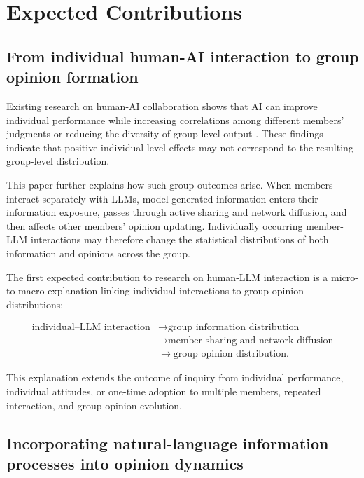 \documentclass[11pt,a4paper]{article}
\begin{document}
\section{Expected Contributions}

\subsection{From individual human-AI interaction to group opinion formation}

Existing research on human-AI collaboration shows that AI can improve individual performance while increasing correlations among different members' judgments or reducing the diversity of group-level output \cite{fugener2021,doshi2024}. These findings indicate that positive individual-level effects may not correspond to the resulting group-level distribution.

This paper further explains how such group outcomes arise. When members interact separately with LLMs, model-generated information enters their information exposure, passes through active sharing and network diffusion, and then affects other members' opinion updating. Individually occurring member-LLM interactions may therefore change the statistical distributions of both information and opinions across the group.

The first expected contribution to research on human-LLM interaction is a micro-to-macro explanation linking individual interactions to group opinion distributions:

\begin{equation*}
\begin{aligned}\text{individual--LLM interaction} &\rightarrow \text{group information distribution} \\
&\rightarrow \text{member sharing and network diffusion} \\
&\rightarrow \text{group opinion distribution}.\end{aligned}
\end{equation*}

This explanation extends the outcome of inquiry from individual performance, individual attitudes, or one-time adoption to multiple members, repeated interaction, and group opinion evolution.

\subsection{Incorporating natural-language information processes into opinion dynamics}
\end{document}
